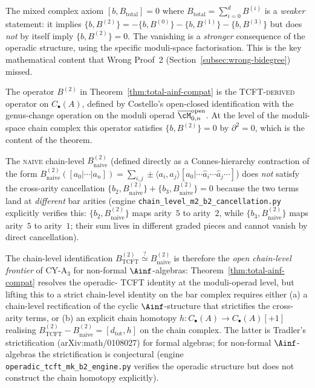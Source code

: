 \begin{remark}
\label{rem:tcft-vs-mixed}
The mixed complex axiom $[b, B_{\mathrm{total}}] = 0$ where
$B_{\mathrm{total}} = \sum_{i=0}^{d} B^{(i)}$ is a
\emph{weaker} statement: it implies
$\{b, B^{(2)}\} = -\{b, B^{(0)}\} - \{b, B^{(1)}\} - \{b, B^{(3)}\}$
but does \emph{not} by itself imply $\{b, B^{(2)}\} = 0$.  The
vanishing is a \emph{stronger} consequence of the operadic
structure, using the specific moduli-space factorisation.  This
is the key mathematical content that Wrong Proof~2
(Section~\ref{subsec:wrong-bidegree}) missed.
\end{remark}

\begin{remark}
\label{rem:tcft-vs-naive-b2}
The operator $B^{(2)}$ in Theorem~\ref{thm:total-ainf-compat} is the
\textsc{TCFT-derived} operator on $C_\bullet(A)$, defined by Costello's
open-closed identification with the genus-change operation on the moduli
operad $\overline{\cM}_{0,n}^{\mathrm{open}}$.  At the level of the moduli-
space chain complex this operator satisfies $\{b, B^{(2)}\} = 0$ by
$\partial^2 = 0$, which is the content of the theorem.

The \textsc{naive} chain-level $B^{(2)}_{\mathrm{naive}}$ \textup{(}defined
directly as a Connes-hierarchy contraction of the form
$B^{(2)}_{\mathrm{naive}}([a_0 | \cdots | a_n]) = \sum_{i,j} \pm \langle a_i,
a_j \rangle [a_0 | \cdots \hat{a}_i \cdots \hat{a}_j \cdots]$\textup{)} does
\emph{not} satisfy the cross-arity cancellation
$\{b_2, B^{(2)}_{\mathrm{naive}}\} + \{b_3, B^{(2)}_{\mathrm{naive}}\} = 0$
because the two terms land at \emph{different} bar arities
\textup{(}engine \texttt{chain\_level\_m2\_b2\_cancellation.py} explicitly
verifies this: $\{b_2, B^{(2)}_{\mathrm{naive}}\}$ maps arity~$5$ to
arity~$2$, while $\{b_3, B^{(2)}_{\mathrm{naive}}\}$ maps arity~$5$ to
arity~$1$; their sum lives in different graded pieces and cannot vanish by
direct cancellation\textup{).}

The chain-level identification
$B^{(2)}_{\mathrm{TCFT}} \overset{?}{\simeq} B^{(2)}_{\mathrm{naive}}$
is therefore the \emph{open chain-level frontier} of CY-A$_3$ for non-formal
$\Ainf$-algebras: Theorem~\ref{thm:total-ainf-compat} resolves the operadic-
TCFT identity at the moduli-operad level, but lifting this to a strict
chain-level identity on the bar complex requires either
\textup{(}a\textup{)} a chain-level rectification of the cyclic
$\Ainf$-structure that strictifies the cross-arity terms, or
\textup{(}b\textup{)} an explicit chain homotopy
$h \colon C_\bullet(A) \to C_\bullet(A)[+1]$ realising
$B^{(2)}_{\mathrm{TCFT}} - B^{(2)}_{\mathrm{naive}} = [d_{\mathrm{tot}}, h]$
on the chain complex.  The latter is Tradler's strictification
\textup{(}arXiv:math/0108027\textup{)} for formal algebras; for non-formal
$\Ainf$-algebras the strictification is conjectural \textup{(}engine
\texttt{operadic\_tcft\_mk\_b2\_engine.py} verifies the operadic structure
but does not construct the chain homotopy explicitly\textup{).}


\end{remark}
